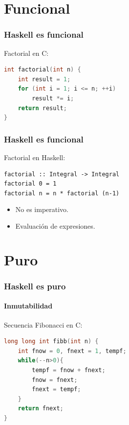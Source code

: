\documentclass{beamer}
\begin{document}

\section{Funcional}

\begin{frame}[fragile]
  \frametitle{Haskell es funcional}

Factorial en C: 

\begin{lstlisting}[language=c]
int factorial(int n) {
    int result = 1;
    for (int i = 1; i <= n; ++i)
        result *= i;
    return result;
}
\end{lstlisting}


\end{frame}


\begin{frame}[fragile]
  \frametitle{Haskell es funcional}

Factorial en Haskell: 

\begin{lstlisting}
factorial :: Integral -> Integral
factorial 0 = 1
factorial n = n * factorial (n-1)
\end{lstlisting}

\vspace{0.3cm}

\begin{itemize}
\item No es imperativo.
\item Evaluación de expresiones. 
\end{itemize}

\end{frame}


\section{Puro}

\begin{frame}[fragile]
  \frametitle{Haskell es puro}
  \framesubtitle{Inmutabilidad}

Secuencia Fibonacci en C: 

\begin{lstlisting}[language=c]
long long int fibb(int n) {
    int fnow = 0, fnext = 1, tempf;
    while(--n>0){
        tempf = fnow + fnext;
        fnow = fnext;
        fnext = tempf;
    }
    return fnext;	
}
\end{lstlisting}

\end{frame}
\end{document}
